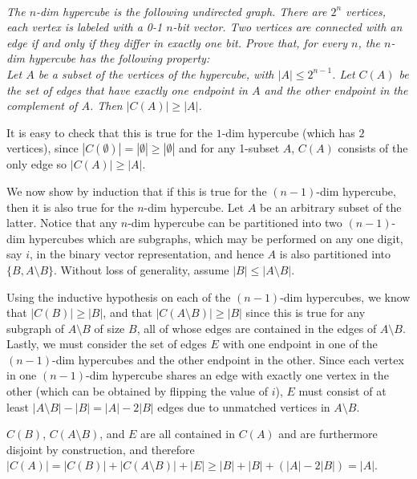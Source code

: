 \documentclass{article}
\begin{document}


\\
\emph{The $n$-dim hypercube is the following undirected graph. 
There are $2^n$ vertices, each vertex is labeled with a 0-1 $n$-bit vector.
Two vertices are connected with an edge if and only if they differ in exactly one bit. 
Prove that, for every $n$,  the $n$-dim hypercube has the following property: \\
Let $A$ be a subset of the vertices of the hypercube, 
with $|A|\leq 2^{n-1}$. 
Let $C(A)$ be the set of edges that have exactly one endpoint in $A$ and the other endpoint in the complement of $A$. 
Then $|C(A)|\geq |A|$.} \par
It is easy to check that this is true for the $1$-dim hypercube (which has $2$ vertices), since $|C(\emptyset)| = |\emptyset| \geq |\emptyset|$ and for any 1-subset $A$, $C(A)$ consists of the only edge so $|C(A)| \geq |A|$. \par
We now show by induction that if this is true for the $(n - 1)$-dim hypercube, then it is also true for the $n$-dim hypercube. Let $A$ be an arbitrary subset of the latter. Notice that any $n$-dim hypercube can be partitioned into two $(n - 1)$-dim hypercubes which are subgraphs, which may be performed on any one digit, say $i$, in the binary vector representation, and hence $A$ is also partitioned into $\{ B, A \setminus B \}$. Without loss of generality, assume $|B| \leq |A \setminus B|$. \par
Using the inductive hypothesis on each of the $(n - 1)$-dim hypercubes, we know that $|C(B)| \geq |B|$, and that $|C(A \setminus B)| \geq |B|$ since this is true for any subgraph of $A \setminus B$ of size $B$, all of whose edges are contained in the edges of $A \setminus B$. Lastly, we must consider the set of edges $E$ with one endpoint in one of the $(n - 1)$-dim hypercubes and the other endpoint in the other. Since each vertex in one $(n - 1)$-dim hypercube shares an edge with exactly one vertex in the other (which can be obtained by flipping the value of $i$), $E$ must consist of at least $|A \setminus B| - |B| = |A| - 2|B|$ edges due to unmatched vertices in $A \setminus B$. \par
$C(B)$, $C(A \setminus B)$, and $E$ are all contained in $C(A)$ and are furthermore disjoint by construction, and therefore $|C(A)| = |C(B)| + |C(A \setminus B)| + |E| \geq |B| + |B| + (|A| - 2|B|) = |A|$.

\end{document}
